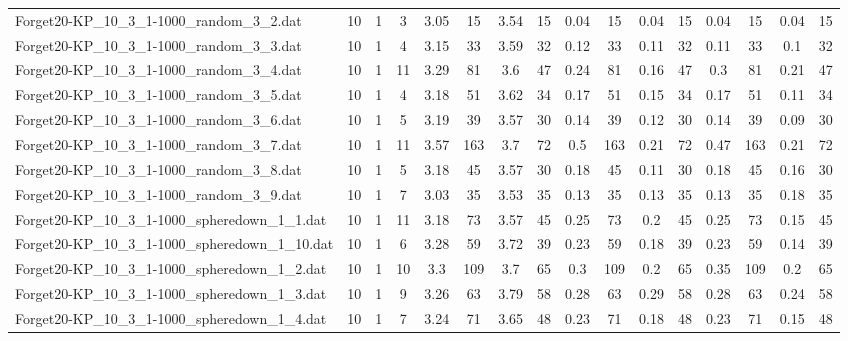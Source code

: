 \begin{sidewaystable}[!ht]
{\begin{tabular}{lccccccccccccccc}
Forget20-KP\_10\_3\_1-1000\_random\_3\_2.dat & 10 & 1 & 3 & 3.05 & 15 & 3.54 & 15 &  \textcolor{blue2}{0.04} & 15 &  \textcolor{blue2}{0.04} & 15 &  \textcolor{blue2}{0.04} & 15 &  \textcolor{blue2}{0.04} & 15 \\
Forget20-KP\_10\_3\_1-1000\_random\_3\_3.dat & 10 & 1 & 4 & 3.15 & 33 & 3.59 & 32 & 0.12 & 33 & 0.11 & 32 & 0.11 & 33 &  \textcolor{blue2}{0.1} & 32 \\
Forget20-KP\_10\_3\_1-1000\_random\_3\_4.dat & 10 & 1 & 11 & 3.29 & 81 & 3.6 & 47 & 0.24 & 81 & 0.16 & 47 & 0.3 & 81 & 0.21 & 47 \\
Forget20-KP\_10\_3\_1-1000\_random\_3\_5.dat & 10 & 1 & 4 & 3.18 & 51 & 3.62 & 34 & 0.17 & 51 & 0.15 & 34 & 0.17 & 51 &  \textcolor{blue2}{0.11} & 34 \\
Forget20-KP\_10\_3\_1-1000\_random\_3\_6.dat & 10 & 1 & 5 & 3.19 & 39 & 3.57 & 30 & 0.14 & 39 & 0.12 & 30 & 0.14 & 39 &  \textcolor{blue2}{0.09} & 30 \\
Forget20-KP\_10\_3\_1-1000\_random\_3\_7.dat & 10 & 1 & 11 & 3.57 & 163 & 3.7 & 72 & 0.5 & 163 &  \textcolor{blue2}{0.21} & 72 & 0.47 & 163 &  \textcolor{blue2}{0.21} & 72 \\
Forget20-KP\_10\_3\_1-1000\_random\_3\_8.dat & 10 & 1 & 5 & 3.18 & 45 & 3.57 & 30 & 0.18 & 45 & 0.11 & 30 & 0.18 & 45 & 0.16 & 30 \\
Forget20-KP\_10\_3\_1-1000\_random\_3\_9.dat & 10 & 1 & 7 & 3.03 & 35 & 3.53 & 35 &  \textcolor{blue2}{0.13} & 35 &  \textcolor{blue2}{0.13} & 35 &  \textcolor{blue2}{0.13} & 35 & 0.18 & 35 \\
Forget20-KP\_10\_3\_1-1000\_spheredown\_1\_1.dat & 10 & 1 & 11 & 3.18 & 73 & 3.57 & 45 & 0.25 & 73 & 0.2 & 45 & 0.25 & 73 &  \textcolor{blue2}{0.15} & 45 \\
Forget20-KP\_10\_3\_1-1000\_spheredown\_1\_10.dat & 10 & 1 & 6 & 3.28 & 59 & 3.72 & 39 & 0.23 & 59 & 0.18 & 39 & 0.23 & 59 &  \textcolor{blue2}{0.14} & 39 \\
Forget20-KP\_10\_3\_1-1000\_spheredown\_1\_2.dat & 10 & 1 & 10 & 3.3 & 109 & 3.7 & 65 & 0.3 & 109 &  \textcolor{blue2}{0.2} & 65 & 0.35 & 109 &  \textcolor{blue2}{0.2} & 65 \\
Forget20-KP\_10\_3\_1-1000\_spheredown\_1\_3.dat & 10 & 1 & 9 & 3.26 & 63 & 3.79 & 58 & 0.28 & 63 & 0.29 & 58 & 0.28 & 63 &  \textcolor{blue2}{0.24} & 58 \\
Forget20-KP\_10\_3\_1-1000\_spheredown\_1\_4.dat & 10 & 1 & 7 & 3.24 & 71 & 3.65 & 48 & 0.23 & 71 & 0.18 & 48 & 0.23 & 71 &  \textcolor{blue2}{0.15} & 48 \\

\end{tabular}}
\end{sidewaystable}
